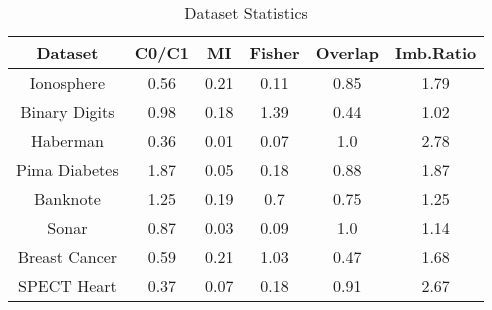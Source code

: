 \begin{table}[htbp]
\caption{Dataset Statistics}
\begin{center}
\begin{tabular}{|c|c|c|c|c|c|}
\hline
\textbf{Dataset} & \textbf{C0/C1} & \textbf{MI} & \textbf{Fisher} & \textbf{Overlap} & \textbf{Imb.Ratio} \\ \hline
Ionosphere & 0.56 & 0.21 & 0.11 & 0.85 & 1.79 \\ \hline
Binary Digits & 0.98 & 0.18 & 1.39 & 0.44 & 1.02 \\ \hline
Haberman & 0.36 & 0.01 & 0.07 & 1.0 & 2.78 \\ \hline
Pima Diabetes & 1.87 & 0.05 & 0.18 & 0.88 & 1.87 \\ \hline
Banknote & 1.25 & 0.19 & 0.7 & 0.75 & 1.25 \\ \hline
Sonar & 0.87 & 0.03 & 0.09 & 1.0 & 1.14 \\ \hline
Breast Cancer & 0.59 & 0.21 & 1.03 & 0.47 & 1.68 \\ \hline
SPECT Heart & 0.37 & 0.07 & 0.18 & 0.91 & 2.67 \\ \hline
\end{tabular}
\label{tab:statistics}
\end{center}
\end{table}